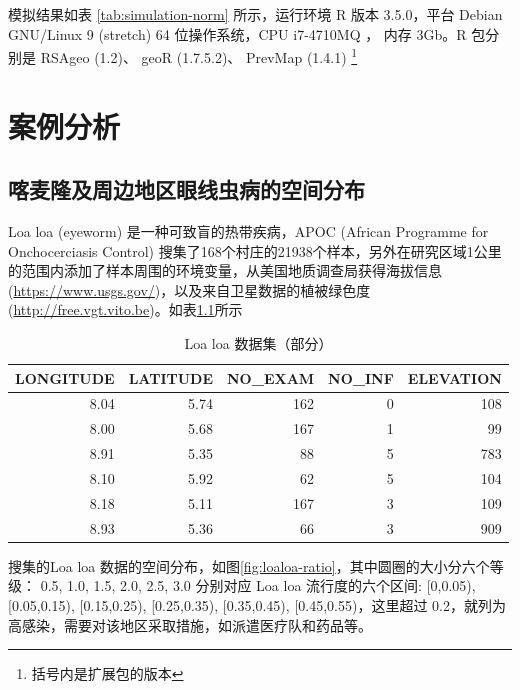 \documentclass[hyperref, a4paper, UTF8, zihao = -4, linespread = 1.25, scheme = chinese]{ctexbook}
\begin{document}
模拟结果如表 \ref{tab:simulation-norm} 所示，运行环境 R 版本 3.5.0，平台
Debian GNU/Linux 9 (stretch) 64 位操作系统，CPU i7-4710MQ ， 内存 3Gb。R
包分别是 RSAgeo (1.2)、 geoR (1.7.5.2)、 PrevMap (1.4.1) \footnote{括号内是扩展包的版本}

\hypertarget{applications}{%
\chapter{案例分析}\label{applications}}

\section{喀麦隆及周边地区眼线虫病的空间分布}

Loa loa (eyeworm) 是一种可致盲的热带疾病，APOC (African Programme for
Onchocerciasis Control)
搜集了168个村庄的21938个样本，另外在研究区域1公里的范围内添加了样本周围的环境变量\citep{Thomson2004Mapping}，从美国地质调查局获得海拔信息(\url{https://www.usgs.gov/})，以及来自卫星数据的植被绿色度(\url{http://free.vgt.vito.be})。如表\ref{tab:loaloa-data}所示

\begin{longtable}[t]{rrrrr}
\caption{\label{tab:loaloa-data}Loa loa 数据集（部分）}\\
\toprule
LONGITUDE & LATITUDE & NO\_EXAM & NO\_INF & ELEVATION\\
\midrule
8.04 & 5.74 & 162 & 0 & 108\\
8.00 & 5.68 & 167 & 1 & 99\\
8.91 & 5.35 & 88 & 5 & 783\\
8.10 & 5.92 & 62 & 5 & 104\\
8.18 & 5.11 & 167 & 3 & 109\\
8.93 & 5.36 & 66 & 3 & 909\\
\bottomrule
\end{longtable}

搜集的Loa loa
数据的空间分布，如图\ref{fig:loaloa-ratio}，其中圆圈的大小分六个等级：
0.5, 1.0, 1.5, 2.0, 2.5, 3.0 分别对应 Loa loa 流行度的六个区间:
{[}0,0.05), {[}0.05,0.15), {[}0.15,0.25), {[}0.25,0.35), {[}0.35,0.45),
{[}0.45,0.55)，这里超过
0.2，就列为高感染，需要对该地区采取措施，如派遣医疗队和药品等。
\end{document}
